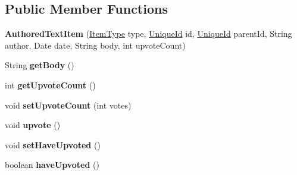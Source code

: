 \subsection*{Public Member Functions}
\begin{DoxyCompactItemize}
\item 
\hypertarget{classcom_1_1ualberta_1_1team17_1_1_authored_text_item_af97e00c96e16e7b4c7e140cc0dab17a8}{{\bfseries Authored\+Text\+Item} (\hyperlink{enumcom_1_1ualberta_1_1team17_1_1_item_type}{Item\+Type} type, \hyperlink{classcom_1_1ualberta_1_1team17_1_1_unique_id}{Unique\+Id} id, \hyperlink{classcom_1_1ualberta_1_1team17_1_1_unique_id}{Unique\+Id} parent\+Id, String author, Date date, String body, int upvote\+Count)}\label{classcom_1_1ualberta_1_1team17_1_1_authored_text_item_af97e00c96e16e7b4c7e140cc0dab17a8}

\item 
\hypertarget{classcom_1_1ualberta_1_1team17_1_1_authored_text_item_aa35816b62261c3c6e6a1a906ac695266}{String {\bfseries get\+Body} ()}\label{classcom_1_1ualberta_1_1team17_1_1_authored_text_item_aa35816b62261c3c6e6a1a906ac695266}

\item 
\hypertarget{classcom_1_1ualberta_1_1team17_1_1_authored_text_item_af4d12606bb57eab84ab11c727bd0e91e}{int {\bfseries get\+Upvote\+Count} ()}\label{classcom_1_1ualberta_1_1team17_1_1_authored_text_item_af4d12606bb57eab84ab11c727bd0e91e}

\item 
\hypertarget{classcom_1_1ualberta_1_1team17_1_1_authored_text_item_a206ac920391f071c4dc4b9235937dd33}{void {\bfseries set\+Upvote\+Count} (int votes)}\label{classcom_1_1ualberta_1_1team17_1_1_authored_text_item_a206ac920391f071c4dc4b9235937dd33}

\item 
\hypertarget{classcom_1_1ualberta_1_1team17_1_1_authored_text_item_ab3869648604681bd0e27cfe44a48f00f}{void {\bfseries upvote} ()}\label{classcom_1_1ualberta_1_1team17_1_1_authored_text_item_ab3869648604681bd0e27cfe44a48f00f}

\item 
\hypertarget{classcom_1_1ualberta_1_1team17_1_1_authored_text_item_a7fc2400103b3cad88e5291085ce4343b}{void {\bfseries set\+Have\+Upvoted} ()}\label{classcom_1_1ualberta_1_1team17_1_1_authored_text_item_a7fc2400103b3cad88e5291085ce4343b}

\item 
\hypertarget{classcom_1_1ualberta_1_1team17_1_1_authored_text_item_aaef9760a66f079b3fb331367060045da}{boolean {\bfseries have\+Upvoted} ()}\label{classcom_1_1ualberta_1_1team17_1_1_authored_text_item_aaef9760a66f079b3fb331367060045da}


\end{DoxyCompactItemize}
